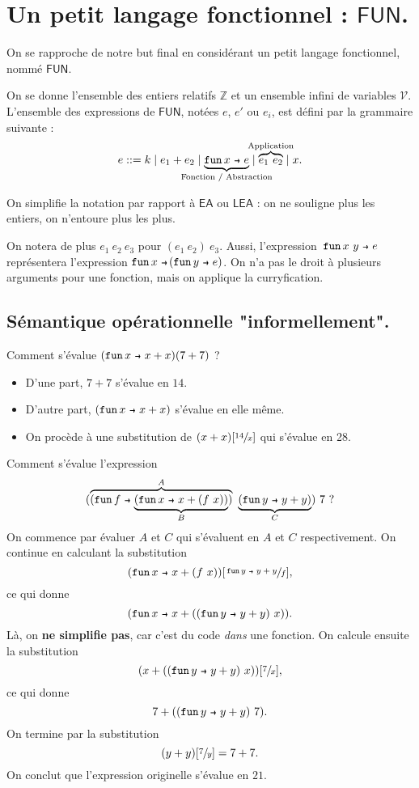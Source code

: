 \documentclass[../main]{subfiles}
\begin{document}
  \chapter{Un petit langage fonctionnel : $\mathsf{FUN}$.} \label{thprog-chap06}
  \minitoc
  
  On se rapproche de notre but final en considérant un petit langage fonctionnel, nommé $\mathsf{FUN}$.

  On se donne l'ensemble des entiers relatifs $\mathds{Z}$ et un ensemble infini de variables $\mathcal{V}$.
  L'ensemble des expressions de $\mathsf{FUN}$, notées $e$, $e'$ ou $e_i$,  est défini 
  par la grammaire suivante :
  \[
    e ::= k  \mid e_1 + e_2  \mid \underbrace{\fun x e}_{\mathclap{\text{Fonction / Abstraction}}} \mid \overbrace{e_1\ e_2}^{\mathclap{\text{Application}}}  \mid x
  .\]

  \begin{note}
    On simplifie la notation par rapport à $\mathsf{EA}$ ou $\mathsf{LEA}$ : on ne souligne plus les entiers, on n'entoure plus les plus.

    On notera de plus $e_1\ e_2\ e_3$ pour $(e_1\ e_2)\ e_3$.
    Aussi, l'expression~$\fun {x\ y} e$ représentera l'expression $\fun x (\fun y e)$.
    On n'a pas le droit à plusieurs arguments pour une fonction, mais on applique la curryfication.
  \end{note}

  \section{Sémantique opérationnelle "informellement".}

  \begin{exm}
    Comment s'évalue $(\fun x x + x)(7 + 7)$ ?
    \begin{itemize}
      \item D'une part, $7 + 7$ s'évalue en $14$.
      \item D'autre part, $(\fun x x + x)$ s'évalue en elle même.
      \item On procède à une substitution de $(x + x)[\sfrac{14}{x}]$ qui s'évalue en 28.
    \end{itemize}
  \end{exm}

  \begin{exm}
    Comment s'évalue l'expression \[
      (\overbrace{(\fun f \underbrace{(\fun x x + (f\ x))}_B)}^A\ \underbrace{(\fun y y + y)}_C)\ 7\ 
    ?\]
    On commence par évaluer $A$ et $C$ qui s'évaluent en $A$ et $C$ respectivement.
    On continue en calculant la substitution 
    \[
      (\fun x x + (f\ x))[\sfrac{\fun y y + y}{f}]
    ,\] ce qui donne \[
      (\fun x x + ((\fun y y + y)\ x))
    .\]
    Là, on \textbf{ne simplifie pas}, car c'est du code \textit{dans} une fonction.
    On calcule ensuite la substitution \[
      (x + ((\fun y y + y)\ x))[\sfrac{7}{x}]
    ,\]
    ce qui donne \[
      7 + ((\fun y y + y)\ 7)
    .\]
    On termine par la substitution \[
      (y + y)[\sfrac{7}{y}] = 7 + 7
    .\]
    On conclut que l'expression originelle s'évalue en $21$.
      
  \end{exm}
\end{document}

